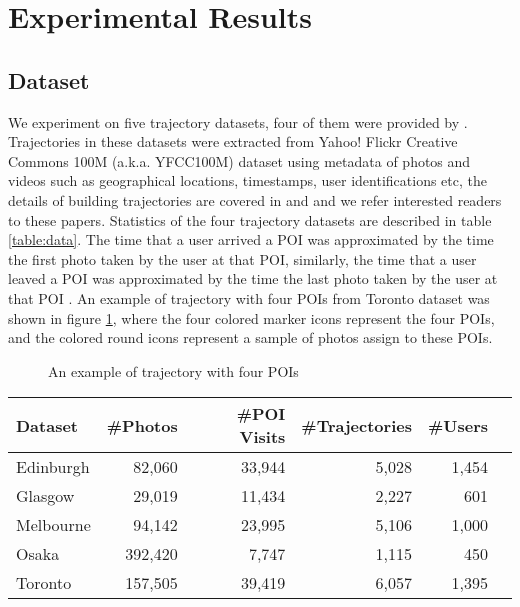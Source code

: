 \section{Experimental Results}
\label{experiment}

\subsection{Dataset}
\label{experiment:dataset}
We experiment on five trajectory datasets, four of them were provided by \cite{ijcai15}.
Trajectories in these datasets were extracted from Yahoo! Flickr Creative Commons 100M 
(a.k.a. YFCC100M) dataset\cite{thomee2016yfcc100m} using metadata of photos and videos 
such as geographical locations, timestamps, user identifications etc, 
the details of building trajectories are covered in \cite{ht10} and \cite{ijcai15} and
we refer interested readers to these papers.
Statistics of the four trajectory datasets are described in table \ref{table:data}.
%
The time that a user arrived a POI was approximated by the time the first photo taken by the user at that POI,
similarly, the time that a user leaved a POI was approximated by the time the last photo taken by the user at 
that POI \cite{ht10, ijcai15}.
An example of trajectory with four POIs from Toronto dataset was shown in figure \ref{fig:traj}, 
where the four colored marker icons represent the four POIs, 
and the colored round icons represent a sample of photos assign to these POIs.


\begin{figure}
\centering
{}
\caption{An example of trajectory with four POIs}
\label{fig:traj}
\end{figure}

\begin{table*}
\centering
\begin{tabular}{lrrrrr} \hline
\textbf{Dataset} & \textbf{\#Photos} & \textbf{\#POI Visits} & \textbf{\#Trajectories} & \textbf{\#Users} \\ \hline
Edinburgh & 82,060 & 33,944 & 5,028 & 1,454 \\ 
Glasgow & 29,019 & 11,434 & 2,227 & 601 \\ 
Melbourne & 94,142 & 23,995 & 5,106 & 1,000 \\ 
Osaka & 392,420 & 7,747 & 1,115 & 450 \\ 
Toronto & 157,505 & 39,419 & 6,057 & 1,395 \\ 
\hline
\end{tabular}
\caption{Statistics of trajectory dataset}
\label{table:data}
\end{table*}


